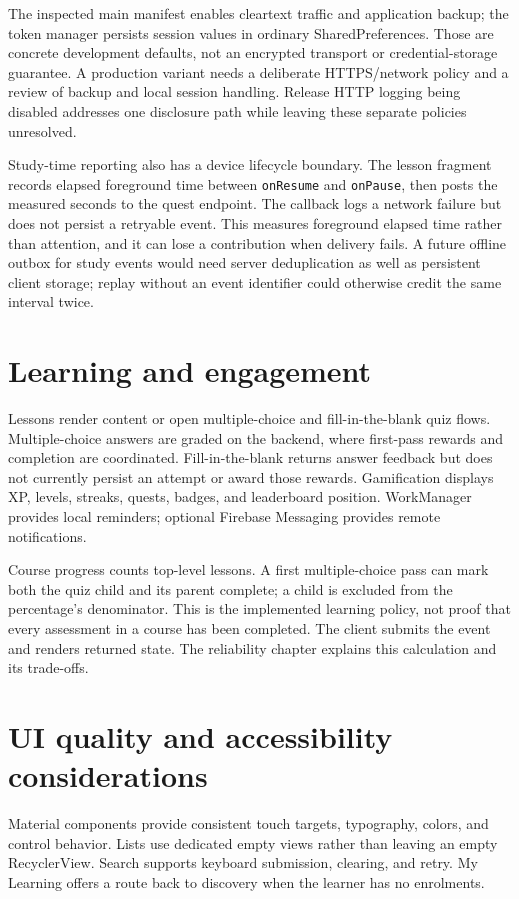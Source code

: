 \documentclass[12pt,a4paper,oneside]{report}
\begin{document}
The inspected main manifest enables cleartext traffic and application backup; the
token manager persists session values in ordinary SharedPreferences. Those are
concrete development defaults, not an encrypted transport or credential-storage
guarantee. A production variant needs a deliberate HTTPS/network policy and a review
of backup and local session handling. Release HTTP logging being disabled addresses
one disclosure path while leaving these separate policies unresolved.

Study-time reporting also has a device lifecycle boundary. The lesson fragment
records elapsed foreground time between \texttt{onResume} and \texttt{onPause}, then
posts the measured seconds to the quest endpoint. The callback logs a network failure
but does not persist a retryable event. This measures foreground elapsed time rather
than attention, and it can lose a contribution when delivery fails. A future offline
outbox for study events would need server deduplication as well as persistent client
storage; replay without an event identifier could otherwise credit the same interval
twice.

\section{Learning and engagement}
Lessons render content or open multiple-choice and fill-in-the-blank quiz flows.
Multiple-choice answers are graded on the backend, where first-pass rewards and
completion are coordinated. Fill-in-the-blank returns answer feedback but does not
currently persist an attempt or award those rewards. Gamification displays XP, levels, streaks, quests,
badges, and leaderboard position. WorkManager provides local reminders; optional
Firebase Messaging provides remote notifications.

Course progress counts top-level lessons. A first multiple-choice pass can mark both
the quiz child and its parent complete; a child is excluded from the percentage's
denominator. This is the implemented learning policy, not proof that every assessment
in a course has been completed. The client submits the event and renders returned
state. The reliability chapter explains this calculation and its trade-offs.

\section{UI quality and accessibility considerations}
Material components provide consistent touch targets, typography, colors, and control
behavior. Lists use dedicated empty views rather than leaving an empty RecyclerView.
Search supports keyboard submission, clearing, and retry. My Learning offers a route
back to discovery when the learner has no enrolments.
\end{document}
